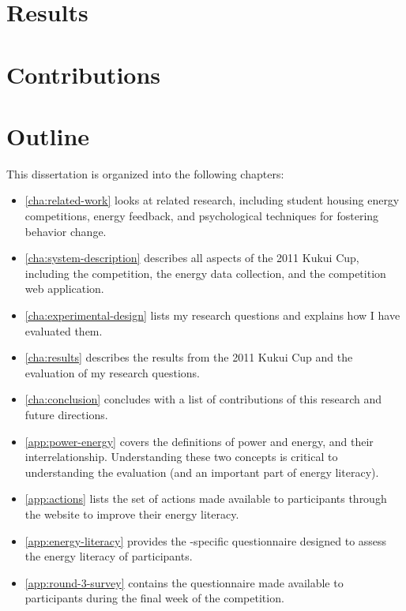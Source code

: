 \section{Results}



\section{Contributions}



\section{Outline}

This dissertation is organized into the following chapters:

\begin{itemize}
	\item \autoref{cha:related-work} looks at related research, including student housing energy competitions, energy feedback, and psychological techniques for fostering behavior change.
	\item \autoref{cha:system-description} describes all aspects of the 2011 Kukui Cup, including the competition, the energy data collection, and the competition web application.
	\item \autoref{cha:experimental-design} lists my research questions and explains how I have evaluated them.
	\item \autoref{cha:results} describes the results from the 2011 Kukui Cup and the evaluation of my research questions.
	\item \autoref{cha:conclusion} concludes with a list of contributions of this research and future directions.
	\item \autoref{app:power-energy} covers the definitions of power and energy, and their interrelationship. Understanding these two concepts is critical to understanding the evaluation (and an important part of energy literacy).
	\item \autoref{app:actions} lists the set of actions made available to participants through the website to improve their energy literacy.
	\item \autoref{app:energy-literacy} provides the \Hawaii-specific questionnaire designed to assess the energy literacy of participants.
	\item \autoref{app:round-3-survey} contains the questionnaire made available to participants during the final week of the competition.
\end{itemize}
